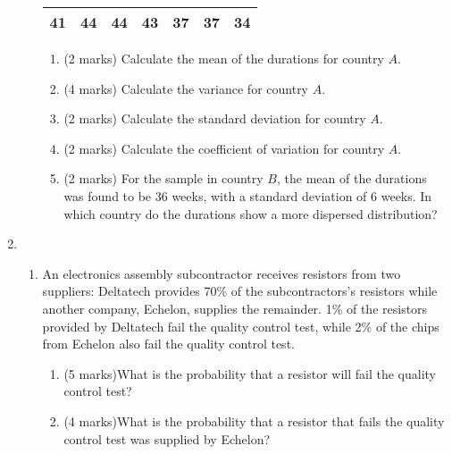 \begin{enumerate}
\begin{enumerate}
\begin{table}[ht]
\begin{center}
\begin{tabular}{|rrrrrrr|}
					\hline
					41 & 44 & 44 & 43 & 37 & 37 & 34  \\
					\hline
				\end{tabular}
			\end{center}
		\end{table}
		\vspace{-0.5cm}
		
		
		\begin{enumerate}
			\item (2 marks) Calculate the mean of the durations for country $A$.
			\item (4 marks) Calculate the variance for country $A$.
			\item (2 marks) Calculate the standard deviation for country $A$.
			\item (2 marks) Calculate the coefficient of variation for country $A$.
			
			\item (2 marks) For the sample in country $B$, the mean of the durations was found to be 36 weeks, with a standard deviation of 6 weeks. In which country do the durations show a more dispersed distribution?
			
		\end{enumerate}
		
		
	\end{enumerate}
	\newpage
	\item
	\begin{enumerate}
		
		\item An electronics assembly subcontractor receives resistors from two suppliers: Deltatech provides
		70\% of the subcontractors's resistors while another company, Echelon, supplies the remainder.
		1\% of the resistors provided by Deltatech fail the quality control test, while 2\% of the
		chips from Echelon also fail the quality control test.
		
		\begin{enumerate}
			\item (5 marks)What is the probability that a resistor will fail the quality control test?
			
			
			\item (4 marks)What is the probability that a resistor that fails the quality control test was supplied by Echelon?
		\end{enumerate}
		
		
		\vspace{0.25cm}
		

\end{enumerate}
\end{enumerate}
